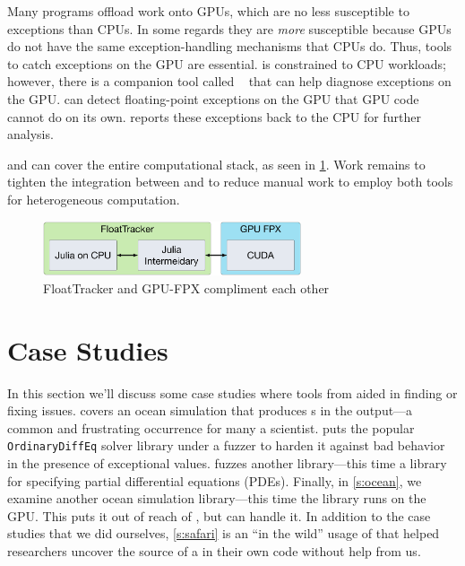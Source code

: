 \documentclass{juliacon}
\begin{document}
Many programs offload work onto GPUs, which are no less susceptible to \fp{} exceptions than CPUs.
In some regards they are \emph{more} susceptible because GPUs do not have the same exception-handling mechanisms that CPUs do.
Thus, tools to catch \fp{} exceptions on the GPU are essential.
\FT{} is constrained to CPU workloads; however, there is a companion tool called \GPUFPX{}~\cite{llsflg-hpdc-2023} that can help diagnose \fp{} exceptions on the GPU.
\GPUFPX{} can detect floating-point exceptions on the GPU that GPU code cannot do on its own.
\GPUFPX{} reports these exceptions back to the CPU for further analysis.

\FT{} and \GPUFPX{} can cover the entire computational stack, as seen in \cref{fig:ft_and_gpu_fpx}.
Work remains to tighten the integration between \FT{} and \GPUFPX{} to reduce manual work to employ both tools for heterogeneous computation.

\begin{figure}[t]
  \centering
  \includegraphics[width=3in]{./fig/float_tracker_context_boxes.png}
  \caption{FloatTracker and GPU-FPX compliment each other}
  \label{fig:ft_and_gpu_fpx}
\end{figure}

\section{Case Studies}
\label{s:casestudies}

In this section we'll discuss some case studies where tools from \FlowFPX{} aided in finding or fixing \fp{} issues.
 covers an ocean simulation that produces \NaN{}s in the output---a common and frustrating occurrence for many a scientist.  puts the popular \texttt{OrdinaryDiffEq} solver library under a fuzzer to harden it against bad behavior in the presence of exceptional \fp{} values.  fuzzes another library---this time a library for specifying partial differential equations (PDEs). Finally, in \cref{s:ocean}, we examine another ocean simulation library---this time the library runs on the GPU. This puts it out of reach of \FT{}, but \GPUFPX{} can handle it. In addition to the case studies that we did ourselves, \cref{s:safari} is an ``in the wild'' usage of \FT{} that helped researchers uncover the source of a \NaN{} in their own code without help from us.
\end{document}
